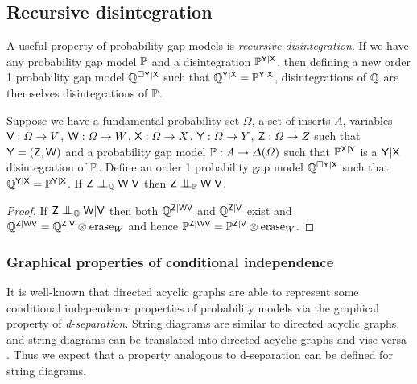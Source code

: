 \subsection{Recursive disintegration}

A useful property of probability gap models is \emph{recursive disintegration}. If we have any probability gap model $\mathbb{P}$ and a disintegration $\mathbb{P}^{\mathsf{Y}|\mathsf{X}}$, then defining a new order 1 probability gap model $\mathbb{Q}^{\square\mathsf{Y}|\mathsf{X}}$ such that $\mathbb{Q}^{\mathsf{Y}|\mathsf{X}}=\mathbb{P}^{\mathsf{Y}|\mathsf{X}}$, disintegrations of $\mathbb{Q}$ are themselves disintegrations of $\mathbb{P}$.


\begin{corollary}
Suppose we have a fundamental probability set $\Omega$, a set of inserts $A$, variables $\mathsf{V}:\Omega\to V$, $\mathsf{W}:\Omega\to W$, $\mathsf{X}:\Omega\to X$, $\mathsf{Y}:\Omega\to Y$, $\mathsf{Z}:\Omega\to Z$ such that $\mathsf{Y}=(\mathsf{Z},\mathsf{W})$ and a probability gap model $\mathbb{P}:A\to \Delta(\Omega)$ such that $\mathbb{P}^{\mathsf{X}|\mathsf{Y}}$ is a $\mathsf{Y}|\mathsf{X}$ disintegration of $\mathbb{P}$. Define an order 1 probability gap model $\mathbb{Q}^{\square \mathsf{Y}|\mathsf{X}}$ such that $\mathbb{Q}^{\mathsf{Y}|\mathsf{X}}=\mathbb{P}^{\mathsf{Y}|\mathsf{X}}$. If $\RV{Z}\CI_{\prob{Q}}\RV{W}|\RV{V}$ then $\RV{Z}\CI_{\prob{P}}\RV{W}|\RV{V}$.
\end{corollary}

\begin{proof}
If $\RV{Z}\CI_{\prob{Q}}\RV{W}|\RV{V}$ then both $\mathbb{Q}^{\mathsf{Z}|\mathsf{WV}}$ and $\mathbb{Q}^{\mathsf{Z}|\mathsf{V}}$ exist and $\mathbb{Q}^{\mathsf{Z}|\mathsf{WV}}=\mathbb{Q}^{\mathsf{Z}|\mathsf{V}}\otimes\text{erase}_{W}$ and hence $\mathbb{P}^{\mathsf{Z}|\mathsf{WV}}=\mathbb{P}^{\mathsf{Z}|\mathsf{V}}\otimes\text{erase}_{W}$.
\end{proof}

\subsubsection{Graphical properties of conditional independence}

It is well-known that directed acyclic graphs are able to represent some conditional independence properties of probability models via the graphical property of \emph{d-separation}. String diagrams are similar to directed acyclic graphs, and string diagrams can be translated into directed acyclic graphs and vise-versa \citep{fong_causal_2013}. Thus we expect that a property analogous to d-separation can be defined for string diagrams.

